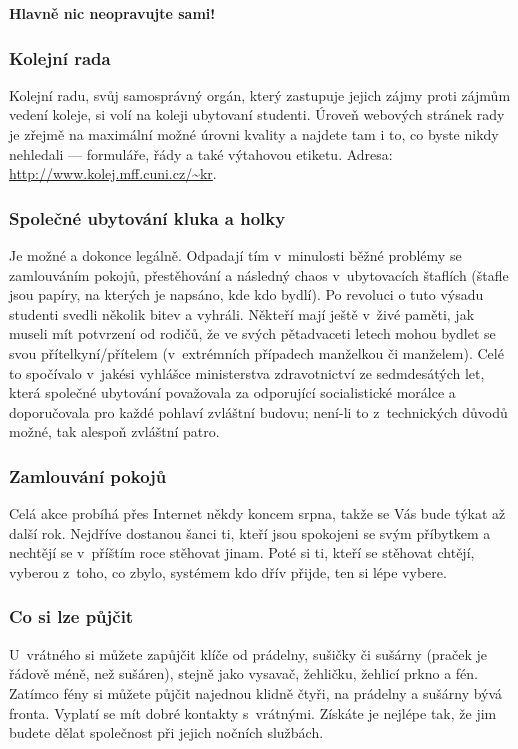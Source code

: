 {\bf Hlavně nic neopravujte sami!\/}

\subsubsection{Kolejní rada}

Kolejní radu, svůj samosprávný orgán, který zastupuje jejich zájmy
proti zájmům vedení koleje, si volí na koleji ubytovaní studenti.
Úroveň webových stránek rady je zřejmě na maximální možné úrovni
kvality a najdete tam i to, co byste nikdy nehledali --- formuláře,
řády a také výtahovou etiketu. Adresa: \url{http://www.kolej.mff.cuni.cz/~kr}.

 \subsubsection{Společné ubytování kluka a holky}

Je možné a dokonce legálně. Odpadají tím v~minulosti běžné problémy
se zamlouváním pokojů, přestěhování  a následný chaos
v~ubytovacích štaflích (štafle jsou papíry, na kterých je napsáno,
kde kdo bydlí). Po revoluci o tuto výsadu studenti svedli několik
bitev a vyhráli. Někteří mají ještě v~živé paměti, jak museli mít
potvrzení od rodičů, že ve svých pětadvaceti letech mohou bydlet se svou
přítelkyní/přítelem (v~extrémních případech manželkou či manželem). Celé
to spo\-čí\-va\-lo v~jakési vyhlášce ministerstva zdravotnictví ze sedmdesátých
let, která společné ubytování považovala za odporující socialistické
morálce a doporučovala pro každé pohlaví zvláštní budovu; není-li to
z~technických důvodů možné, tak alespoň zvláštní patro.

\subsubsection{Zamlouvání pokojů}

Celá akce probíhá přes Internet někdy koncem srpna, takže se Vás
bude týkat až další rok. Nejdříve dostanou šanci ti, kteří jsou
spokojeni se svým příbytkem a nechtějí se v~příštím roce stěhovat
jinam. Poté si ti, kteří se stěhovat chtějí, vyberou z~toho, co
zbylo, systémem kdo dřív přijde, ten si lépe vybere.

\subsubsection{Co si lze půjčit}

U~vrátného si můžete zapůjčit klíče od prádelny, sušičky či
sušárny (praček je řádově méně, než sušáren), stejně jako vysavač,
žehličku, žehlicí prkno a fén. Zatímco fény si můžete půjčit
najednou klidně čtyři, na prádelny a sušárny bývá fronta. Vyplatí
se mít dobré kontakty s~vrátnými. Získáte je nejlépe tak, že jim
budete dělat společnost při jejich nočních službách.

